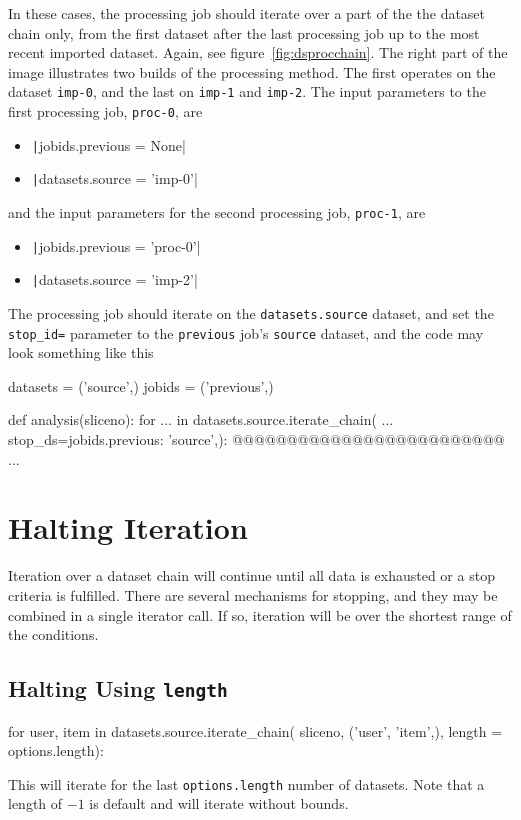 In these cases, the processing job should iterate over a part of the
the dataset chain only, from the first dataset after the last
processing job up to the most recent imported dataset.  Again, see
figure~\ref{fig:dsprocchain}.  The right part of the image illustrates
two builds of the processing method.  The first operates on the
dataset \texttt{imp-0}, and the last on \texttt{imp-1}
and \texttt{imp-2}.  The input parameters to the first processing
job, \texttt{proc-0}, are
\begin{itemize}
\item[] \texttt|jobids.previous = None|
\item[] \texttt|datasets.source = 'imp-0'|
\end{itemize}
and the input parameters for the second processing
job, \texttt{proc-1}, are
\begin{itemize}
\item[] \texttt|jobids.previous = 'proc-0'|
\item[] \texttt|datasets.source = 'imp-2'|
\end{itemize}

The processing job should iterate on the \texttt{datasets.source}
dataset, and set the \texttt{stop\_id=} parameter to
the \texttt{previous} job's \texttt{source} dataset, and the code may
look something like this
\begin{python}
datasets = ('source',)
jobids = ('previous',)

def analysis(sliceno):
    for ... in datasets.source.iterate_chain(
            ...
            stop_ds={jobids.previous: 'source',}):
@@@@@@@@@@@@@@@@@@@@@@@@@
    ...
\end{python}











\section{Halting Iteration}

Iteration over a dataset chain will continue until all data is
exhausted or a stop criteria is fulfilled.  There are several
mechanisms for stopping, and they may be combined in a single iterator
call.  If so, iteration will be over the shortest range of the
conditions.

\subsection{Halting Using \texttt{length}}
\begin{python}
for user, item in datasets.source.iterate_chain(
                       sliceno, ('user', 'item',),
                       length = options.length):
\end{python}
This will iterate for the last \texttt{options.length} number of
datasets.  Note that a length of $-1$ is default and will iterate
without bounds.



